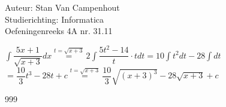 \documentclass[a4paper]{article}
\begin{document}
  
\noindent \large Auteur: Stan Van Campenhout \\
\noindent \large Studierichting:  Informatica\\
\noindent \large Oefeningenreeks 4A nr. 31.11\\

\medskip

\normalsize

$ \displaystyle\int \dfrac{5x+1}{\sqrt{x+3}} dx \stackrel{t = \sqrt{x+3}}{=} 2\displaystyle\int\dfrac{5t^2-14}{t}\cdot tdt =10\displaystyle\int t^2dt - 28\displaystyle\int dt $\\

$ = \dfrac{10}{3}t^3-28t + c \stackrel{t = \sqrt{x+3}}{=} \dfrac{10}{3}\sqrt{\left(x+3\right)^3}-28\sqrt{x+3} + c $\\

\begin{thebibliography}{999}
\end{thebibliography}
\end{document}
